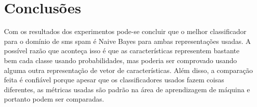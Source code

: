 \section{Conclusões}
	Com os resultados dos experimentos pode-se concluir que o melhor classificador para o domínio de sms spam é Naive Bayes para ambas representações usadas. A possível razão que aconteça isso é que as características representem bastante bem cada classe usando probabilidades, mas poderia ser comprovado usando alguma outra representação de vetor de características. Além disso, a comparação feita é confiável porque apesar que os classificadores usados fazem coisas diferentes, as métricas usadas são padrão na área de aprendizagem de máquina e portanto podem ser comparadas.